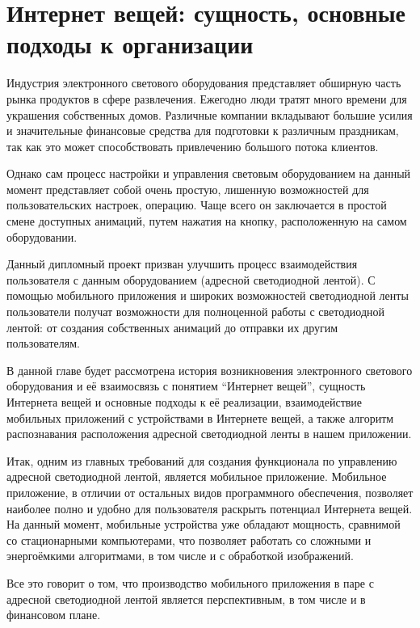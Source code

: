 \section{Интернет вещей: сущность, основные подходы к организации}
\label{sec:subject}

Индустрия электронного светового оборудования представляет обширную часть рынка продуктов в сфере развлечения. Ежегодно люди тратят много времени для украшения собственных домов. Различные компании вкладывают большие усилия и значительные финансовые средства для подготовки к различным праздникам, так как это может способствовать привлечению большого потока клиентов.

Однако сам процесс настройки и управления световым оборудованием на данный момент представляет собой очень простую, лишенную возможностей для пользовательских настроек, операцию. Чаще всего он заключается в простой смене доступных анимаций, путем нажатия на кнопку, расположенную на самом оборудовании.

Данный дипломный проект призван улучшить процесс взаимодействия пользователя с данным оборудованием (адресной светодиодной лентой). С помощью мобильного приложения и широких возможностей светодиодной ленты пользователи получат возможности для полноценной работы с светодиодной лентой: от создания собственных анимаций до отправки их другим пользователям.

В данной главе будет рассмотрена история возникновения электронного светового оборудования и её взаимосвязь с понятием \enquote{Интернет вещей}, сущность Интернета вещей и основные подходы к её реализации, взаимодействие мобильных приложений с устройствами в Интернете вещей, а также алгоритм распознавания расположения адресной светодиодной ленты в нашем приложении.











Итак, одним из главных требований для создания функционала по управлению адресной светодиодной лентой, является мобильное приложение. Мобильное приложение, в отличии от остальных видов программного обеспечения, позволяет наиболее полно и удобно для пользователя раскрыть потенциал Интернета вещей. На данный момент, мобильные устройства уже обладают мощность, сравнимой со стационарными компьютерами, что позволяет работать со сложными и энергоёмкими алгоритмами, в том числе и с обработкой изображений.

Все это говорит о том, что производство мобильного приложения в паре с адресной светодиодной лентой является перспективным, в том числе и в финансовом плане.